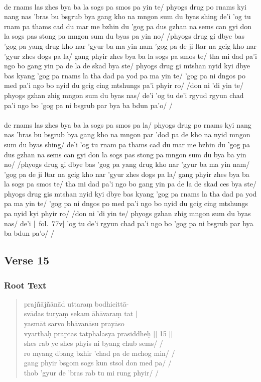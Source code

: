 \documentclass[12pt]{article}
\begin{document}
\textbf{\TVA}\\
de rnams las zhes bya ba la sogs pa smos pa yin te/ phyogs drug po rnams kyi nang nas 'bras bu bsgrub bya gang kho na mngon sum du byas shing de'i 'og tu rnam pa thams cad du mar me bzhin du 'gog pa dus gzhan na sems can gyi don la sogs pas stong pa mngon sum du byas pa yin no/ /phyogs drug gi dbye bas 'gog pa yang drug kho nar 'gyur ba ma yin nam 'gog pa de ji ltar na gcig kho nar 'gyur zhes dogs pa la/ gang phyir zhes bya ba la sogs pa smos te/ tha mi dad pa'i ngo bo gang yin pa de la de skad bya ste/ phyogs drug gi mtshan nyid kyi dbye bas kyang 'gog pa rnams la tha dad pa yod pa ma yin te/ 'gog pa ni dngos po med pa'i ngo bo nyid du gcig cing mtshungs pa'i phyir ro/ /don ni 'di yin te/ phyogs gzhan zhig mngon sum du byas nas/ de'i 'og tu de'i rgyud rgyun chad pa'i ngo bo 'gog pa ni bsgrub par bya ba bdun pa'o/ /\\

\textbf{\TVB}\\
de rnams las zhes bya ba la sogs pa smos pa la/ phyogs drug po rnams kyi nang nas 'bras bu bsgrub bya gang kho na mngon par 'dod pa de kho na nyid mngon sum du byas shing/ de'i 'og tu rnam pa thams cad du mar me bzhin du 'gog pa dus gzhan na sems can gyi don la sogs pas stong pa mngon sum du bya ba yin no/ /phyogs drug gi dbye bas 'gog pa yang drug kho nar 'gyur ba ma yin nam/ 'gog pa de ji ltar na gcig kho nar 'gyur zhes dogs pa la/ gang phyir zhes bya ba la sogs pa smos te/ tha mi dad pa'i ngo bo gang yin pa de la de skad ces bya ste/ phyogs drug gis mtshan nyid kyi dbye bas kyang 'gog pa rnams la tha dad pa yod pa ma yin te/ 'gog pa ni dngos po med pa'i ngo bo nyid du gcig cing mtshungs pa nyid kyi phyir ro/ /don ni 'di yin te/ phyogs gzhan zhig mngon sum du byas nas/ de'i [\TVB\ fol.\ 77v] 'og tu de'i rgyun chad pa'i ngo bo 'gog pa ni bsgrub par bya ba bdun pa'o/ /

\subsection{Verse 15}
\subsubsection{Root Text}
\begin{quote}
	prajñājñānād uttaraṃ bodhicittā-\\
	svādas turyaṃ sekam\footnoteB{
		sekam] \EDD ; seṣam \MS
	} āhāvaraṃ tat |\\
	yasmāt\footnoteB{
		yasmāt] \EDD ; paścāt \MS
	} sarvo bhāvanāsu prayāso \\
	vyarthaḥ prāptas tatphalasya prasiddheḥ || 15 ||\\

	shes rab ye shes phyis ni byang chub sems/ /\\
	ro myang dbang bzhir 'chad pa de mchog min/ /\\
	gang phyir bsgom sogs kun stsol don med pa/ /\\
	thob 'gyur de 'bras rab tu mi rung phyir/ /
\end{quote}
\end{document}
